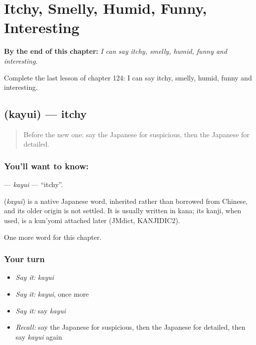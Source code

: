 
\chapter{Itchy, Smelly, Humid, Funny, Interesting}
\label{ch:ja-itchy-smelly-humid-funny-interesting}

\begin{chapteropening}
\textbf{By the end of this chapter:} \emph{I can say itchy, smelly, humid, funny and interesting.}

Complete the last lesson of chapter 124: I can say itchy, smelly, humid, funny and interesting.
\end{chapteropening}

\section[\texorpdfstring{\ja{かゆい} (kayui)}{かゆい (kayui)}]{ (kayui) — itchy}

\label{lesson:JA-C124-kayui}



\begin{quote}
Before the new one: say the Japanese for suspicious, then the Japanese for detailed.
\end{quote}

\subsection*{You'll want to know: }
\textbf{} — \emph{kayui} — \textquotedblleft{}itchy\textquotedblright{}.

\begin{cousinweb}
\textbf{} (\emph{kayui}) is a native Japanese word, inherited rather than borrowed from Chinese, and its older origin is not settled. It is usually written in kana; its kanji, when used, is a kun'yomi attached later (JMdict, KANJIDIC2).
\end{cousinweb}

\begin{grammarlens}[title={What you've built}]
One more word for this chapter.
\end{grammarlens}

\subsection*{Your turn}
\begin{itemize}
\raggedright
  \item \emph{Say it:} \emph{kayui}
  \item \emph{Say it:} \emph{kayui}, once more
  \item \emph{Say it:} say \emph{kayui}
  \item \emph{Recall:} say the Japanese for suspicious, then the Japanese for detailed, then say \emph{kayui} again
\end{itemize}

